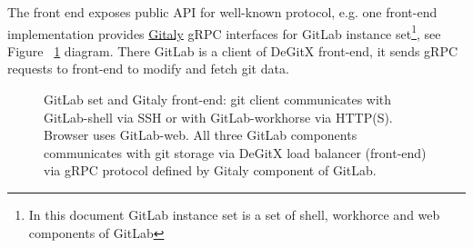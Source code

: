 \documentclass[nonacm=true]{acmart}
\begin{document}
The front end exposes public API for well-known protocol, e.g. one front-end implementation provides
\href{https://docs.gitlab.com/ee/administration/gitaly/}{Gitaly} gRPC interfaces for GitLab
instance set\footnote{In this document GitLab instance set is a set of shell, workhorce and web components of GitLab},
see Figure ~\ref{fig:gitlab-set} diagram. There GitLab is a client of DeGitX front-end, it sends gRPC requests to
front-end to modify and fetch git data.

\begin{figure}
  \begin{center}
  \end{center}
  \caption{
    GitLab set and Gitaly front-end:
    git client communicates with GitLab-shell via SSH or with GitLab-workhorse via HTTP(S).
    Browser uses GitLab-web. All three GitLab components communicates with git storage via DeGitX load balancer
    (front-end) via gRPC protocol defined by Gitaly component of GitLab.
  }
  \label{fig:gitlab-set}
\end{figure}
\end{document}
